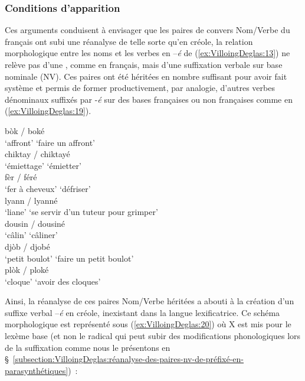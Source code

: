 \documentclass[output=paper]{langsci/langscibook}
\begin{document}
\subsubsection{Conditions d'apparition}\label{subsubsection:VilloingDeglas:conditions-dapparition}

Ces arguments conduisent à envisager que les paires de convers Nom/Verbe
du français ont subi une réanalyse de telle sorte qu'en créole, la
relation morphologique entre les noms et les verbes en --\emph{é} de
(\ref{ex:VilloingDeglas:13}) ne relève pas d'une , comme en français, mais d'une
suffixation verbale sur base nominale (N\textrightarrow{~}V). Ces paires ont été héritées
en nombre suffisant pour avoir fait système et permis de former
productivement, par analogie, d'autres verbes dénominaux suffixés par
-\emph{é} sur des bases françaises ou non françaises comme en (\ref{ex:VilloingDeglas:19}).

\ea \label{ex:VilloingDeglas:19}
  \ea \gll bòk / boké\\
  {`affront'} {} {`faire un affront'}\\
  \ex \gll chiktay / chiktayé\\
  {`émiettage'} {} {`émietter'}\\
  \ex \gll fèr / féré\\
  {`fer à cheveux'} {} {`défriser'}\\
  \ex \gll lyann / lyanné\\
  {`liane'} {} {`se servir d'un tuteur pour grimper'}\\
  \ex \gll dousin / dousiné\\
  {`câlin'} {} {`câliner'}\\
  \ex \gll djòb / djobé\\
  {`petit boulot'} {} {`faire un petit boulot'}\\
  \ex \gll plòk / ploké\\
  {`cloque'} {} {`avoir des cloques'}\\
\z\z


Ainsi, la réanalyse de ces paires Nom/Verbe héritées a abouti à la
création d'un suffixe verbal --\emph{é} en créole, inexistant dans la
langue lexificatrice. Ce schéma morphologique est représenté sous (\ref{ex:VilloingDeglas:20})
où X est mis pour le lexème base (et non le radical qui peut subir des
modifications phonologiques lors de la suffixation comme nous le
présentons en §~\ref{subsection:VilloingDeglas:réanalyse-des-paires-nv-de-préfixé-en-parasynthétiques})~:
\end{document}
